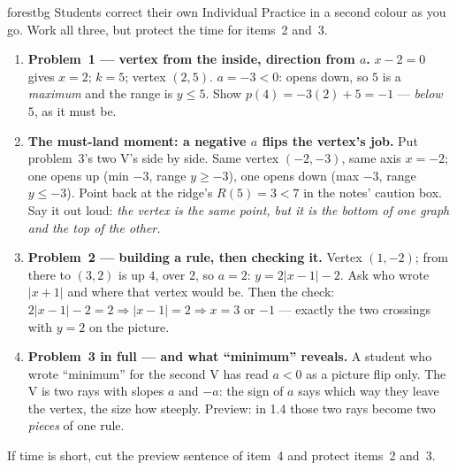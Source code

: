 \documentclass[10pt]{article}
\begin{document}
\boxguard
\begin{skillbox}{forestbg}
Students correct their own Individual Practice in a second colour as you go. Work all three, but
protect the time for items~2 and~3.
\begin{enumerate}[leftmargin=1.3em, nosep, itemsep=2pt]
  \item \textbf{Problem~1 --- vertex from the inside, direction from $a$.} $x-2=0$ gives
        $x=2$; $k=5$; vertex $(2,5)$. $a=-3<0$: opens down, so $5$ is a \emph{maximum} and the
        range is $y\le5$. Show $p(4)=-3(2)+5=-1$ --- \emph{below} $5$, as it must be.
  \item \textbf{The must-land moment: a negative $a$ flips the vertex's job.} Put problem~3's
        two V's side by side. Same vertex $(-2,-3)$, same axis $x=-2$; one opens up (min $-3$,
        range $y\ge-3$), one opens down (max $-3$, range $y\le-3$). Point back at the ridge's
        $R(5)=3<7$ in the notes' caution box. Say it out loud: \emph{the vertex is the same
        point, but it is the bottom of one graph and the top of the other.}
  \item \textbf{Problem~2 --- building a rule, then checking it.} Vertex $(1,-2)$; from there to
        $(3,2)$ is up $4$, over $2$, so $a=2$: $y=2|x-1|-2$. Ask who wrote $|x+1|$ and where that
        vertex would be. Then the check: $2|x-1|-2=2 \Rightarrow |x-1|=2 \Rightarrow x=3$ or
        $-1$ --- exactly the two crossings with $y=2$ on the picture.
  \item \textbf{Problem~3 in full --- and what ``minimum'' reveals.} A student who wrote
        ``minimum'' for the second V has read $a<0$ as a picture flip only. The V is two rays with
        slopes $a$ and $-a$: the sign of $a$ says which way they leave the vertex, the size how
        steeply. Preview: in 1.4 those two rays become two \emph{pieces} of one rule.
\end{enumerate}
If time is short, cut the preview sentence of item~4 and protect items~2 and~3.
\end{skillbox}
\end{document}
